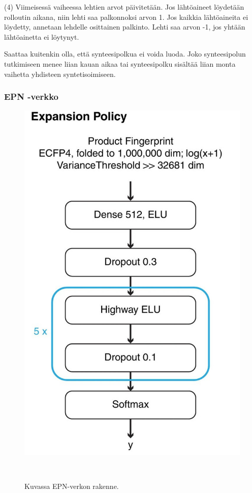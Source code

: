 \documentclass[finnish,twoside,censored,tkt,sw-line]{HYthesisML}
\begin{document}
(4) Viimeisessä vaiheessa lehtien arvot päivitetään.
Jos lähtöaineet löydetään rolloutin aikana, niin lehti saa palkonnoksi arvon 1.
Jos kaikkia lähtöaineita ei löydetty, annetaan lehdelle osittainen palkinto.
Lehti saa arvon -1, jos yhtään lähtöainetta ei löytynyt.

Saattaa kuitenkin olla, että synteesipolkua ei voida luoda.
Joko synteesipolun tutkimiseen menee liian kauan aikaa tai synteesipolku sisältää liian monta vaihetta yhdisteen syntetisoimiseen.


\subsubsection{EPN -verkko}

\begin{figure}[!ht]
    \centering
    \includegraphics[]{expansion-policy.jpg}
    \caption{Kuvassa EPN-verkon rakenne.}
    {~\cite{SeglerMarwinHS2018Pcsw}}
    \label{fig:3n-mcts-epn}
\end{figure}
\end{document}
